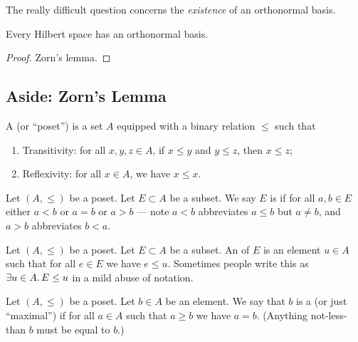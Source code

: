 \begin{node}
The really difficult question concerns the \emph{existence} of an
orthonormal basis.
\end{node}

\begin{theorem}
Every Hilbert space has an orthonormal basis.
\end{theorem}

\begin{proof}
Zorn's lemma.
\end{proof}

\subsection{Aside: Zorn's Lemma}

\begin{definition}
A  (or ``poset'') is a set $A$ equipped
with a binary relation $\leq$ such that
\begin{enumerate}
\item Transitivity: for all $x,y,z\in A$, if $x\leq y$ and $y\leq z$, then $x\leq z$;
\item Reflexivity: for all $x\in A$, we have $x\leq x$.
\end{enumerate}
\end{definition}

\begin{definition}
Let $(A,\leq)$ be a poset. Let $E\subset A$ be a subset. We say $E$ is
 if for all $a,b\in E$ either $a<b$ or $a=b$
or $a>b$ --- note $a<b$ abbreviates $a\leq b$ but $a\neq b$, and $a>b$
abbreviates $b<a$.
\end{definition}

\begin{definition}
Let $(A,\leq)$ be a poset. Let $E\subset A$ be a subset.
An  of $E$ is an element $u\in A$ such that for
all $e\in E$ we have $e\leq u$. Sometimes people write this as
$\exists u\in A\ldotp E\leq u$ in a mild abuse of notation.
\end{definition}

\begin{definition}
Let $(A,\leq)$ be a poset. Let $b\in A$ be an element. We say that $b$
is a  (or just ``maximal'') if for all $a\in A$ 
such that $a\geq b$ we have $a=b$. (Anything not-less-than $b$ must be
equal to $b$.)
\end{definition}

